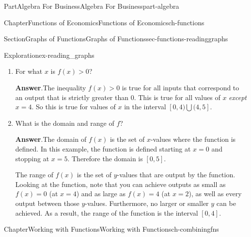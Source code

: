 \documentclass{tufte-book}
\newcommand{\blocktitlefont}{\relax}
\numberwithin{equation}{chapter}
\newcommand{\gt}{>}
\begin{document}
\begin{partptx}{Part}{Algebra For Business}{}{Algebra For Business}{}{}{part-algebra}
\begin{chapterptx}{Chapter}{Functions of Economics}{}{Functions of Economics}{}{}{ch-functions}
\begin{sectionptx}{Section}{Graphs of Functions}{}{Graphs of Functions}{}{}{sec-functions-readinggraphs}
\begin{exploration}{Exploration}{}{ex-reading_graphs}
\begin{enumerate}[font=\bfseries,label=(\alph*),ref=\alph*]
\begin{image}{0.25}{0.5}{0.25}{}
{
}%
\end{image}%
\item{}For what  \(x\) is \(f(x)>0\)?%
\par\smallskip%
\noindent\textbf{\blocktitlefont Answer}.\hypertarget{ex-reading_graphs-6-2}{}\quad{}The inequality \(f(x)\gt 0\) is true for all inputs that correspond to an output that is strictly greater than 0. This is true for all values of \(x\) \emph{except} \(x=4\). So this is true for values of \(x\) in the interval \([0,4)\bigcup(4,5]\).%
\item{}What is the domain and range of \(f\)?%
\par\smallskip%
\noindent\textbf{\blocktitlefont Answer}.\hypertarget{ex-reading_graphs-7-2}{}\quad{}The domain of \(f(x)\) is the set of \(x\)-values where the function is defined.  In this example, the function is defined starting at \(x=0\) and stopping at \(x=5\). Therefore the domain is \([0,5]\).%
\par
The range of \(f(x)\) is the set of \(y\)-values that are output by the function.  Looking at the function, note that you can achieve outputs as small as \(f(x)=0\) (at \(x=4\)) and as large as \(f(x)=4\) (at \(x=2\)), as well as every output between those \(y\)-values. Furthermore, no larger or smaller \(y\) can be achieved.  As a result, the range of the function is the interval \([0,4]\).%
\end{enumerate}%
\end{exploration}%
\end{sectionptx}
\end{chapterptx}
%
\typeout{************************************************}
\typeout{************************************************}
%
\begin{chapterptx}{Chapter}{Working with Functions}{}{Working with Functions}{}{}{ch-combiningfns}
\renewcommand*{\chaptername}{Chapter}
%
%
\typeout{************************************************}
\typeout{************************************************}

\end{chapterptx}
\end{partptx}
\end{document}
